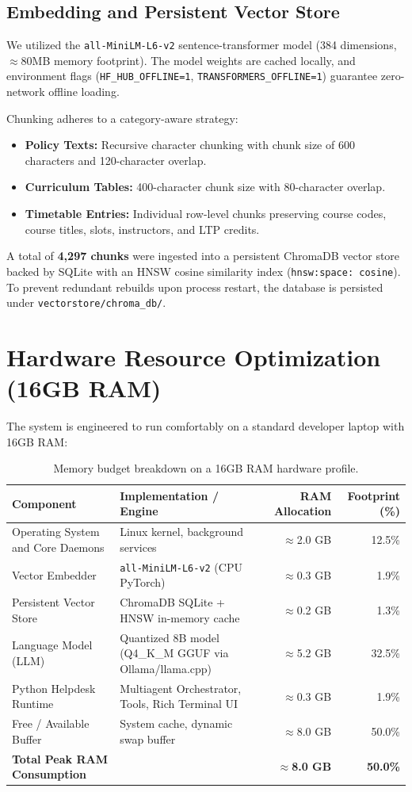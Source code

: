 \documentclass[10pt,a4paper]{article}
\begin{document}
\subsection{Embedding and Persistent Vector Store}
We utilized the \texttt{all-MiniLM-L6-v2} sentence-transformer model (384 dimensions, $\approx$80MB memory footprint). The model weights are cached locally, and environment flags (\texttt{HF\_HUB\_OFFLINE=1}, \texttt{TRANSFORMERS\_OFFLINE=1}) guarantee zero-network offline loading.

Chunking adheres to a category-aware strategy:
\begin{itemize}[noitemsep]
    \item \textbf{Policy Texts:} Recursive character chunking with chunk size of 600 characters and 120-character overlap.
    \item \textbf{Curriculum Tables:} 400-character chunk size with 80-character overlap.
    \item \textbf{Timetable Entries:} Individual row-level chunks preserving course codes, course titles, slots, instructors, and LTP credits.
\end{itemize}

A total of \textbf{4,297 chunks} were ingested into a persistent ChromaDB vector store backed by SQLite with an HNSW cosine similarity index (\texttt{hnsw:space: cosine}). To prevent redundant rebuilds upon process restart, the database is persisted under \texttt{vectorstore/chroma\_db/}.

\section{Hardware Resource Optimization (16GB RAM)}
The system is engineered to run comfortably on a standard developer laptop with 16GB RAM:
\begin{table}[htbp]
\centering\small
\begin{tabularx}{\textwidth}{lXrr}
\toprule
\textbf{Component} & \textbf{Implementation / Engine} & \textbf{RAM Allocation} & \textbf{Footprint (\%)} \\
\midrule
Operating System and Core Daemons & Linux kernel, background services & $\approx$2.0 GB & 12.5\% \\
Vector Embedder & \texttt{all-MiniLM-L6-v2} (CPU PyTorch) & $\approx$0.3 GB & 1.9\% \\
Persistent Vector Store & ChromaDB SQLite + HNSW in-memory cache & $\approx$0.2 GB & 1.3\% \\
Language Model (LLM) & Quantized 8B model (Q4\_K\_M GGUF via Ollama/llama.cpp) & $\approx$5.2 GB & 32.5\% \\
Python Helpdesk Runtime & Multiagent Orchestrator, Tools, Rich Terminal UI & $\approx$0.3 GB & 1.9\% \\
Free / Available Buffer & System cache, dynamic swap buffer & $\approx$8.0 GB & 50.0\% \\
\midrule
\textbf{Total Peak RAM Consumption} & & \textbf{$\approx$8.0 GB} & \textbf{50.0\%} \\
\bottomrule
\end{tabularx}
\caption{Memory budget breakdown on a 16GB RAM hardware profile.}
\label{tab:memory}
\end{table}
\end{document}
